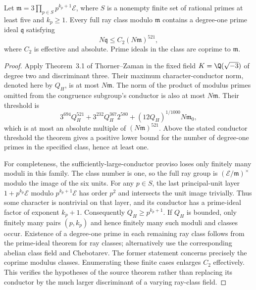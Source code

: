 \begin{lemma}
\label{lem:xc-ray-prime}
Let $\mathfrak m=3\prod_{p\in S}p^{k_p+1}\mathcal E$, where $S$ is a
nonempty finite set of rational primes at least five and $k_p\ge1$.
Every full ray class modulo $\mathfrak m$ contains a degree-one prime ideal
$\mathfrak q$ satisfying
\[
 N\mathfrak q\le C_2(N\mathfrak m)^{521},
\]
where $C_2$ is effective and absolute. Prime ideals in the class are coprime
to $\mathfrak m$.
\end{lemma}
\begin{proof}
Apply Theorem~3.1 of Thorner--Zaman \cite{XC-ThornerZaman} in the fixed field
$K=\Q(\sqrt{-3})$ of degree two and discriminant three.
Their maximum character-conductor norm, denoted here by $Q_H$, is at most
$N\mathfrak m$. The norm of the product of modulus primes omitted from
the congruence subgroup's conductor is also at most $N\mathfrak m$.
Their threshold is
\[
 3^{694}Q_H^{521}+3^{232}Q_H^{367}2^{580}
 +(12Q_H)^{1/1000}N\mathfrak m_0,
\]
which is at most an absolute multiple of $(N\mathfrak m)^{521}$.
Above the stated conductor threshold the theorem gives a positive lower
bound for the number of degree-one primes in the specified class, hence
at least one.

For completeness, the sufficiently-large-conductor proviso loses only
finitely many moduli in this family. The class number is one, so the full
ray group is $(\mathcal E/\mathfrak m)^\times$ modulo the image of the six
units. For any $p\in S$, the last principal-unit layer
$1+p^{k_p}\mathcal E$ modulo $p^{k_p+1}\mathcal E$ has order $p^2$ and
intersects the unit image trivially. Thus some character is nontrivial on
that layer, and its conductor has a prime-ideal factor of exponent
$k_p+1$. Consequently $Q_H\ge p^{k_p+1}$.
If $Q_H$ is bounded, only finitely many pairs $(p,k_p)$ and hence finitely
many such moduli and classes occur. Existence of a degree-one prime in
each remaining ray class follows from the prime-ideal theorem for ray
classes; alternatively use the corresponding abelian class field and
Chebotarev. The former statement concerns precisely the coprime modulus
classes. Enumerating these finite cases enlarges $C_2$ effectively.
This verifies the hypotheses of the source theorem rather than replacing
its conductor by the much larger discriminant of a varying ray-class field.
\end{proof}

